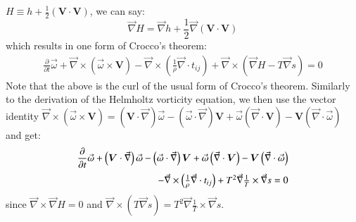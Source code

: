 \documentclass{warpdoc}
\newcommand{\alb}{\vspace{0.2cm}\\} %
\newcommand{\mfd}{\displaystyle}
\begin{document}
$H \equiv h+\frac{1}{2} (\bm{V}\cdot\bm{V})$, we can say:
%
\begin{equation}
  \vec{\nabla}{H}=\vec{\nabla}h+\frac{1}{2} \vec{\nabla} (\bm{V}\cdot\bm{V})
\end{equation}
%
which results in one form of Crocco's theorem:
%
\begin{equation}
 \label{eqn:Crocco:vorticity4}
 \begin{array}{r}
  \mfd\frac{\partial}{\partial t} \vec{\omega}
       +\vec{\nabla} \times \left(\vec{\omega} \times \bm{V}\right)
      - \vec{\nabla} \times \left( \frac{1}{\rho} \vec{\nabla} \cdot t_{ij} \right)
      + \vec{\nabla} \times \left( \vec{\nabla} H - T \vec{\nabla} s
           \right)
      = 0
 \end{array}
\end{equation}
%
Note that the above is the curl of the usual form of Crocco's
theorem.
Similarly to the derivation of the Helmholtz vorticity equation,
we then use the vector identity
$\vec{\nabla} \times \left( \vec{\omega} \times \bm{V} \right) =
       \left( \bm{V} \cdot \vec{\nabla} \right) \vec{\omega}
      -\left( \vec{\omega} \cdot \vec{\nabla} \right) \bm{V}
      +\vec{\omega} \left( \vec{\nabla} \cdot \bm{V} \right)
      -\bm{V} \left( \vec{\nabla} \cdot \vec{\omega} \right)$ and get:
%
\begin{equation}
 \label{eqn:Crocco:vorticity5}
 \begin{array}{r}
  \mfd\frac{\partial}{\partial t} \vec{\omega}
      +\left( \bm{V} \cdot \vec{\nabla} \right) \vec{\omega}
      -\left( \vec{\omega} \cdot \vec{\nabla} \right) \bm{V}
      +\vec{\omega} \left( \vec{\nabla} \cdot \bm{V} \right)
      -\bm{V} \left( \vec{\nabla} \cdot \vec{\omega} \right) \alb
      - \vec{\nabla} \times \left( \frac{1}{\rho} \vec{\nabla} \cdot t_{ij} \right)
      + T^2 \vec{\nabla}\frac{1}{T} \times \vec{\nabla} s 
      = 0
 \end{array}
\end{equation}
%
since $\vec{\nabla} \times \vec{\nabla} H=0$ and
$\vec{\nabla} \times \left( T \vec{\nabla} s \right)=
T^2 \vec{\nabla}\frac{1}{T} \times \vec{\nabla} s $.




  
  
\end{document}

